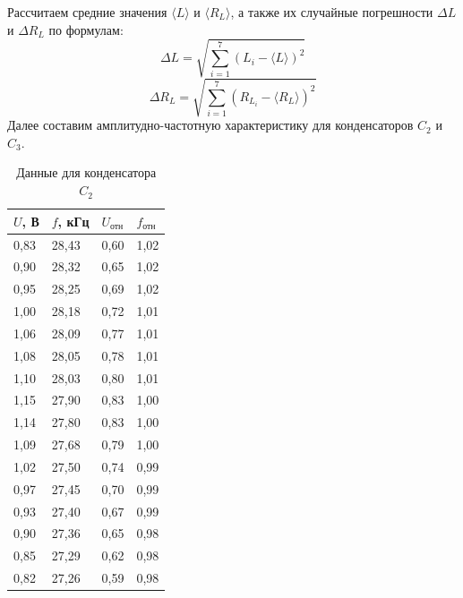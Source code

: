 Рассчитаем средние значения $\langle L \rangle $ и $ \langle R_L \rangle $, а также их случайные погрешности $\Delta L$ и $\Delta R_L$ по формулам:
\begin{equation}
    \Delta L = \sqrt{\sum\limits_{i=1}^7(L_i-\langle L \rangle)^2}
\end{equation}
\begin{equation}
    \Delta R_L = \sqrt{\sum\limits_{i=1}^7(R_{L_i}-\langle R_L \rangle)^2}
\end{equation}
\n\n
Далее составим амплитудно-частотную характеристику для конденсаторов $C_2$ и $C_3$.
\begin{table}[H]
\caption{Данные для конденсатора $C_2$}
    \centering
    \begin{tabular}{|l|l|l|l|}
    \hline
        $U$, В & $f$, кГц & $U_{\text{отн}}$ & $f_{\text{отн}}$ \\ \hline
        0,83 & 28,43 & 0,60 & 1,02 \\ \hline
        0,90 & 28,32 & 0,65 & 1,02 \\ \hline
        0,95 & 28,25 & 0,69 & 1,02 \\ \hline
        1,00 & 28,18 & 0,72 & 1,01 \\ \hline
        1,06 & 28,09 & 0,77 & 1,01 \\ \hline
        1,08 & 28,05 & 0,78 & 1,01 \\ \hline
        1,10 & 28,03 & 0,80 & 1,01 \\ \hline
        1,15 & 27,90 & 0,83 & 1,00 \\ \hline
        1,14 & 27,80 & 0,83 & 1,00 \\ \hline
        1,09 & 27,68 & 0,79 & 1,00 \\ \hline
        1,02 & 27,50 & 0,74 & 0,99 \\ \hline
        0,97 & 27,45 & 0,70 & 0,99 \\ \hline
        0,93 & 27,40 & 0,67 & 0,99 \\ \hline
        0,90 & 27,36 & 0,65 & 0,98 \\ \hline
        0,85 & 27,29 & 0,62 & 0,98 \\ \hline
        0,82 & 27,26 & 0,59 & 0,98 \\ \hline
    \end{tabular}
\end{table}
